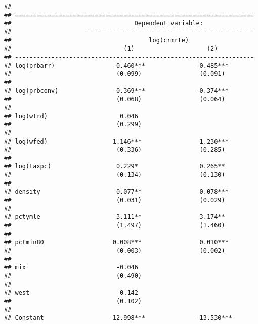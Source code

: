 \documentclass[]{article}
\begin{document}
\begin{verbatim}
## 
## ==================================================================
##                                  Dependent variable:              
##                     ----------------------------------------------
##                                      log(crmrte)                  
##                               (1)                    (2)          
## ------------------------------------------------------------------
## log(prbarr)                -0.460***              -0.485***       
##                             (0.099)                (0.091)        
##                                                                   
## log(prbconv)               -0.369***              -0.374***       
##                             (0.068)                (0.064)        
##                                                                   
## log(wtrd)                    0.046                                
##                             (0.299)                               
##                                                                   
## log(wfed)                  1.146***                1.230***       
##                             (0.336)                (0.285)        
##                                                                   
## log(taxpc)                  0.229*                 0.265**        
##                             (0.134)                (0.130)        
##                                                                   
## density                     0.077**                0.078***       
##                             (0.031)                (0.029)        
##                                                                   
## pctymle                     3.111**                3.174**        
##                             (1.497)                (1.460)        
##                                                                   
## pctmin80                   0.008***                0.010***       
##                             (0.003)                (0.002)        
##                                                                   
## mix                         -0.046                                
##                             (0.490)                               
##                                                                   
## west                        -0.142                                
##                             (0.102)                               
##                                                                   
## Constant                  -12.998***              -13.530***      

\end{verbatim}
\end{document}
